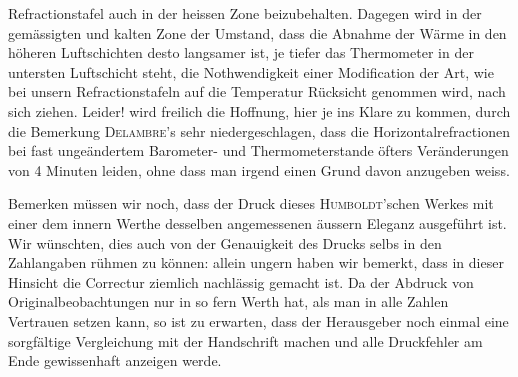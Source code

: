 Refractionstafel auch in der heissen Zone beizubehalten. Dagegen wird in der gemässigten und kalten Zone der Umstand, dass die Abnahme der Wärme in den höheren Luftschichten desto langsamer ist, je tiefer das Thermometer in der untersten Luftschicht steht, die Nothwendigkeit einer Modification der Art, wie bei unsern Refractionstafeln auf die Temperatur Rücksicht genommen wird, nach sich ziehen. Leider! wird freilich die Hoffnung, hier je ins Klare zu kommen, durch die Bemerkung \textsc{Delambre}'s sehr niedergeschlagen, dass die Horizontalrefractionen bei fast ungeändertem Barometer- und Thermometerstande öfters Veränderungen von 4 Minuten leiden, ohne dass man irgend einen Grund davon anzugeben weiss.

Bemerken müssen wir noch, dass der Druck dieses \textsc{Humboldt}'schen Werkes mit einer dem innern Werthe desselben angemessenen äussern Eleganz ausgeführt ist. Wir wünschten, dies auch von der Genauigkeit des Drucks selbs in den Zahlangaben rühmen zu können: allein ungern haben wir bemerkt, dass in dieser Hinsicht die Correctur ziemlich nachlässig gemacht ist. Da der Abdruck von Originalbeobachtungen nur in so fern Werth hat, als man in alle Zahlen Vertrauen setzen kann, so ist zu erwarten, dass der Herausgeber noch einmal eine sorgfältige Vergleichung mit der Handschrift machen und alle Druckfehler am Ende gewissenhaft anzeigen werde.
